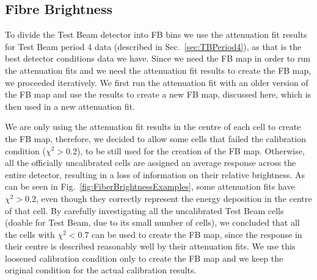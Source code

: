 
\subsection{Fibre Brightness}\label{sec:FibreBrightnessTB}

To divide the Test Beam detector into \gls{FB} bins we use the attenuation fit results for Test Beam period 4 data (described in Sec.~\ref{sec:TBPeriod4}), as that is the best detector conditions data we have. Since we need the \gls{FB} map in order to run the attenuation fits and we need the attenuation fit results to create the \gls{FB} map, we proceeded iteratively. We first run the attenuation fit with an older version of the \gls{FB} map and use the results to create a new \gls{FB} map, discussed here, which is then used in a new attenuation fit.

We are only using the attenuation fit results in the centre of each cell to create the \gls{FB} map, therefore, we decided to allow some cells that failed the calibration condition ($\chi^2>0.2$), to be still used for the creation of the \gls{FB} map. Otherwise, all the officially uncalibrated cells are assigned an average response across the entire detector, resulting in a loss of information on their relative brightness. As can be seen in Fig.~\ref{fig:FiberBrightnessExamples}, some attenuation fits have $\chi^2>0.2$, even though they correctly represent the energy deposition in the centre of that cell. By carefully investigating all the uncalibrated Test Beam cells (doable for Test Beam, due to its small number of cells), we concluded that all the cells with $\chi^2<0.7$ can be used to create the \gls{FB} map, since the response in their centre is described reasonably well by their attenuation fits. We use this loosened calibration condition only to create the \gls{FB} map and we keep the original condition for the actual calibration results.


